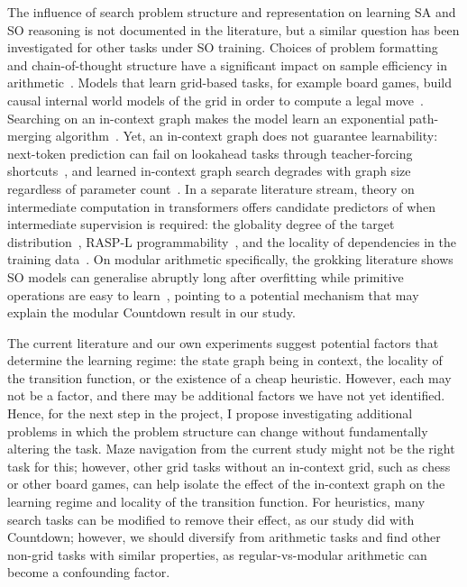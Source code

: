 The influence of search problem structure and representation on learning SA and SO reasoning is not documented in the literature, but a similar question has been investigated for other tasks under SO training.
Choices of problem formatting and chain-of-thought structure have a significant impact on sample efficiency in arithmetic~\citep{leeTeachingArithmeticSmall2023}.
Models that learn grid-based tasks, for example board games, build causal internal world models of the grid in order to compute a legal move~\citep{liEmergentWorldRepresentations2024,spiesTransformersUseCausal2024}.
Searching on an in-context graph makes the model learn an exponential path-merging algorithm~\citep{saparovTransformersStruggleLearn2025}.
Yet, an in-context graph does not guarantee learnability: next-token prediction can fail on lookahead tasks through teacher-forcing shortcuts~\citep{bachmannPitfallsNexttokenPrediction2025}, and learned in-context graph search degrades with graph size regardless of parameter count~\citep{saparovTransformersStruggleLearn2025}.
In a separate literature stream, theory on intermediate computation in transformers offers candidate predictors of when intermediate supervision is required: the globality degree of the target distribution~\citep{abbeHowFarCan2024}, RASP-L programmability~\citep{zhouWhatAlgorithmsCan2023}, and the locality of dependencies in the training data~\citep{prystawskiWhyThinkStep2023}.
On modular arithmetic specifically, the grokking literature shows SO models can generalise abruptly long after overfitting while primitive operations are easy to learn~\citep{powerGrokkingGeneralization2022,nandaProgressMeasuresGrokking2023}, pointing to a potential mechanism that may explain the modular Countdown result in our study.

The current literature and our own experiments suggest potential factors that determine the learning regime: the state graph being in context, the locality of the transition function, or the existence of a cheap heuristic.
However, each may not be a factor, and there may be additional factors we have not yet identified.
Hence, for the next step in the project, I propose investigating additional problems in which the problem structure can change without fundamentally altering the task.
Maze navigation from the current study might not be the right task for this; however, other grid tasks without an in-context grid, such as chess or other board games, can help isolate the effect of the in-context graph on the learning regime and locality of the transition function.
For heuristics, many search tasks can be modified to remove their effect, as our study did with Countdown; however, we should diversify from arithmetic tasks and find other non-grid tasks with similar properties, as regular-vs-modular arithmetic can become a confounding factor.

